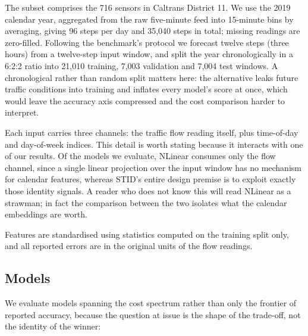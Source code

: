 \documentclass[manuscript,screen,review]{acmart}
\begin{document}
The subset comprises the 716 sensors in Caltrans District 11. We use the 2019
calendar year, aggregated from the raw five-minute feed into 15-minute bins by
averaging, giving 96 steps per day and 35,040 steps in total; missing readings
are zero-filled. Following the benchmark's protocol we forecast twelve steps
(three hours) from a twelve-step input window, and split the year
chronologically in a 6:2:2 ratio into 21,010 training, 7,003 validation and
7,004 test windows. A chronological rather than random split matters here: the
alternative leaks future traffic conditions into training and inflates every
model's score at once, which would leave the accuracy axis compressed and the
cost comparison harder to interpret.

Each input carries three channels: the traffic flow reading itself, plus
time-of-day and day-of-week indices. This detail is worth stating because it
interacts with one of our results. Of the models we evaluate, NLinear consumes
only the flow channel, since a single linear projection over the input window
has no mechanism for calendar features, whereas STID's entire design premise
is to exploit exactly those identity signals. A reader who does not know this
will read NLinear as a strawman; in fact the comparison between the two
isolates what the calendar embeddings are worth.

Features are standardised using statistics computed on the training split
only, and all reported errors are in the original units of the flow readings.

\subsection{Models}
We evaluate models spanning the cost spectrum rather than only the frontier of
reported accuracy, because the question at issue is the shape of the
trade-off, not the identity of the winner:
\end{document}

